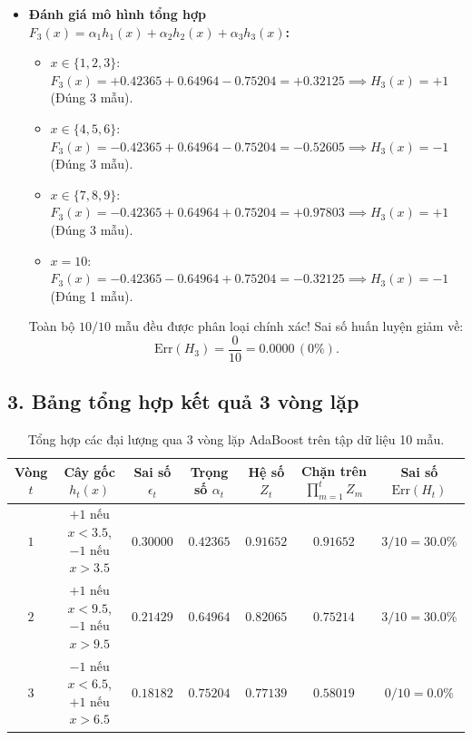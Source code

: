 \documentclass[11pt, a4paper]{article}
\begin{document}
\begin{itemize}
\begin{itemize}
        \[
        D_4(i) = \frac{\frac{7}{66} \cdot \frac{\sqrt{2}}{3}}{\frac{6\sqrt{2}}{11}} = \frac{7}{108} \approx 0.06481.
        \]
    \end{itemize}
    Kiểm tra tổng: $4 \times \frac{1}{8} + 3 \times \frac{11}{108} + 3 \times \frac{7}{108} = \frac{1}{2} + \frac{54}{108} = 1$.
    \item \textbf{Đánh giá mô hình tổng hợp $F_3(x) = \alpha_1 h_1(x) + \alpha_2 h_2(x) + \alpha_3 h_3(x)$:}
    \begin{itemize}
        \item $x \in \{1, 2, 3\}$: $F_3(x) = +0.42365 + 0.64964 - 0.75204 = +0.32125 \implies H_3(x) = +1$ (Đúng 3 mẫu).
        \item $x \in \{4, 5, 6\}$: $F_3(x) = -0.42365 + 0.64964 - 0.75204 = -0.52605 \implies H_3(x) = -1$ (Đúng 3 mẫu).
        \item $x \in \{7, 8, 9\}$: $F_3(x) = -0.42365 + 0.64964 + 0.75204 = +0.97803 \implies H_3(x) = +1$ (Đúng 3 mẫu).
        \item $x = 10$: $F_3(x) = -0.42365 - 0.64964 + 0.75204 = -0.32125 \implies H_3(x) = -1$ (Đúng 1 mẫu).
    \end{itemize}
    Toàn bộ $10/10$ mẫu đều được phân loại chính xác! Sai số huấn luyện giảm về:
    \[
    \text{Err}(H_3) = \frac{0}{10} = 0.0000 \, (0\%).
    \]
\end{itemize}

\subsection*{3. Bảng tổng hợp kết quả 3 vòng lặp}

\begin{table}[h!]
\centering
\renewcommand{\arraystretch}{1.25}
\begin{tabular}{@{}ccccccc@{}}
\toprule
\textbf{Vòng $t$} & \textbf{Cây gốc $h_t(x)$} & \textbf{Sai số $\epsilon_t$} & \textbf{Trọng số $\alpha_t$} & \textbf{Hệ số $Z_t$} & \textbf{Chặn trên $\prod_{m=1}^t Z_m$} & \textbf{Sai số $\text{Err}(H_t)$} \\
\midrule
$1$ & $+1$ nếu $x < 3.5$, $-1$ nếu $x > 3.5$ & $0.30000$ & $0.42365$ & $0.91652$ & $0.91652$ & $3/10 = 30.0\%$ \\
$2$ & $+1$ nếu $x < 9.5$, $-1$ nếu $x > 9.5$ & $0.21429$ & $0.64964$ & $0.82065$ & $0.75214$ & $3/10 = 30.0\%$ \\
$3$ & $-1$ nếu $x < 6.5$, $+1$ nếu $x > 6.5$ & $0.18182$ & $0.75204$ & $0.77139$ & $0.58019$ & $0/10 = 0.0\%$ \\
\bottomrule
\end{tabular}
\caption{Tổng hợp các đại lượng qua 3 vòng lặp AdaBoost trên tập dữ liệu 10 mẫu.}
\end{table}
\end{document}
